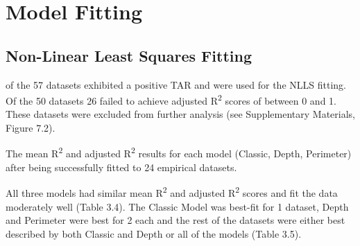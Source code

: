 {\section{Model Fitting}

\subsection{Non-Linear Least Squares Fitting}


 of the 57 datasets exhibited a positive TAR and were used for the NLLS fitting. Of the 50 datasets 26 failed to achieve adjusted R\textsuperscript{2} scores of between 0 and 1. These datasets were excluded from further analysis (see Supplementary Materials, Figure 7.2). 

\begin{table}[h!]
  \begin{center}
    \caption{The mean R\textsuperscript{2} and adjusted R\textsuperscript{2} results for each model (Classic, Depth, Perimeter) after being successfully fitted to 24 empirical datasets.}
    \label{table5}
  \end{center}
\end{table}

\noindent All three models had similar mean R\textsuperscript{2} and adjusted R\textsuperscript{2} scores and fit the data moderately well (Table 3.4). The Classic Model was best-fit for 1 dataset, Depth and Perimeter were best for 2 each and the rest of the datasets were either best described by both Classic and Depth or all of the models (Table 3.5).  \\

}
